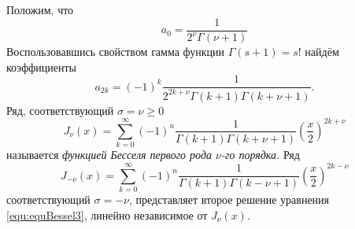 Положим, что 
\[
	a_0 = \frac{1}{2 ^\nu \Gamma(\nu + 1)}
\]
Воспользовавшись свойством гамма функции $\Gamma(s + 1) = s!$ найдём коэффициенты
\[
	a_{2k} = (-1)^k \frac{1}{2^{2k + \nu} \Gamma(k + 1) \Gamma(k + \nu + 1)}.
\]
Ряд, соответствующий $\sigma = \nu \geqslant 0$
\begin{equation}
	J_\nu(x) = \sum\limits_{k = 0}^\infty (- 1)^n \frac{1}{\Gamma(k + 1)\Gamma(k + \nu + 1)} \left(\frac{x}{2} \right)^{2k + \nu}
	\label{equ:equBessel8}
\end{equation}
называется \textit{функцией Бесселя первого рода $\nu$-го порядка.}
Ряд
\begin{equation}
	J_{-\nu}(x) = \sum\limits_{k = 0}^\infty (- 1)^n \frac{1}{\Gamma(k + 1)\Gamma(k - \nu + 1)} \left(\frac{x}{2} \right)^{2k - \nu}
	\label{equ:equBessel9}
\end{equation}
соответствующий $\sigma = - \nu$, представляет второе решение уравнения \eqref{equ:equBessel3}, линейно независимое от $J_\nu(x)$.
